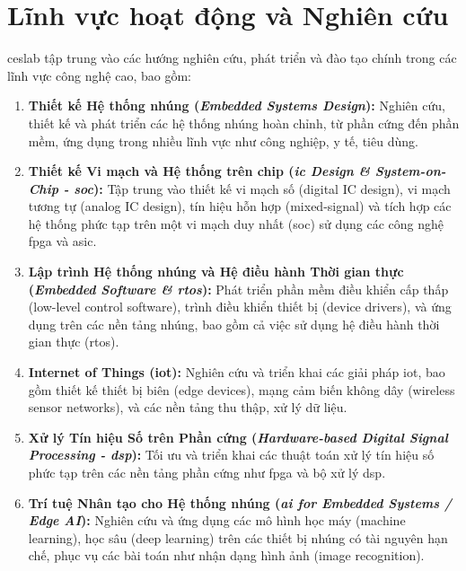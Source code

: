
\section{Lĩnh vực hoạt động và Nghiên cứu}
\label{subsec:ceslab_activities}

\acrshort{ceslab} tập trung vào các hướng nghiên cứu, phát triển và đào tạo chính trong các lĩnh vực công nghệ cao, bao gồm:

\begin{enumerate}
    \item \textbf{Thiết kế Hệ thống nhúng (\textit{Embedded Systems Design}):} Nghiên cứu, thiết kế và phát triển các hệ thống nhúng hoàn chỉnh, từ phần cứng đến phần mềm, ứng dụng trong nhiều lĩnh vực như công nghiệp, y tế, tiêu dùng.
    \item \textbf{Thiết kế Vi mạch và Hệ thống trên chip (\textit{\acrshort{ic} Design \& System-on-Chip - \acrshort{soc}}):} Tập trung vào thiết kế vi mạch số (digital IC design), vi mạch tương tự (analog IC design), tín hiệu hỗn hợp (mixed-signal) và tích hợp các hệ thống phức tạp trên một vi mạch duy nhất (\acrshort{soc}) sử dụng các công nghệ \acrshort{fpga} và \acrshort{asic}.
    \item \textbf{Lập trình Hệ thống nhúng và Hệ điều hành Thời gian thực (\textit{Embedded Software \& \acrshort{rtos}}):} Phát triển phần mềm điều khiển cấp thấp (low-level control software), trình điều khiển thiết bị (device drivers), và ứng dụng trên các nền tảng nhúng, bao gồm cả việc sử dụng hệ điều hành thời gian thực (\acrshort{rtos}).
    \item \textbf{Internet of Things (\acrshort{iot}):} Nghiên cứu và triển khai các giải pháp \acrshort{iot}, bao gồm thiết kế thiết bị biên (edge devices), mạng cảm biến không dây (wireless sensor networks), và các nền tảng thu thập, xử lý dữ liệu.
    \item \textbf{Xử lý Tín hiệu Số trên Phần cứng (\textit{Hardware-based Digital Signal Processing - \acrshort{dsp}}):} Tối ưu và triển khai các thuật toán xử lý tín hiệu số phức tạp trên các nền tảng phần cứng như \acrshort{fpga} và bộ xử lý \acrshort{dsp}.
    \item \textbf{Trí tuệ Nhân tạo cho Hệ thống nhúng (\textit{\acrshort{ai} for Embedded Systems / Edge AI}):} Nghiên cứu và ứng dụng các mô hình học máy (machine learning), học sâu (deep learning) trên các thiết bị nhúng có tài nguyên hạn chế, phục vụ các bài toán như nhận dạng hình ảnh (image recognition).
\end{enumerate}

